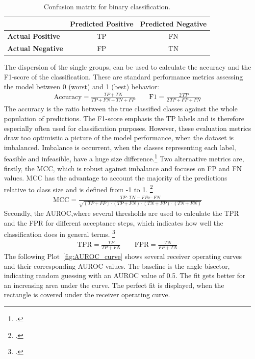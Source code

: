 \begin{table}[ht]
    \centering
    \small
    \begin{tabular}{@{}lcc@{}}
        \toprule
                                 & \textbf{Predicted Positive} & \textbf{Predicted Negative} \\
        \midrule
        \textbf{Actual Positive} & \Gls{TP}                    & \Gls{FN}                    \\
        \textbf{Actual Negative} & \Gls{FP}                    & \Gls{TN}                    \\
        \bottomrule
    \end{tabular}
    \caption{Confusion matrix for binary classification.}
    \label{tab:confusion_matrix}
\end{table}

The dispersion of the single groups, can be used to calculate the accuracy and the F1-score of the classification.
These are standard performance metrics assessing the model between 0 (worst) and 1 (best) behavior:
\begin{align}
    \text{Accuracy}=\frac{TP+TN}{TP+FN+TN+FP}
    \qquad
    \text{F1}=\frac{2\,TP}{2\,TP+FP+FN}
\end{align}
The accuracy is the ratio between the true classified classes against the whole population
of predictions. The F1-score emphasis the \gls{TP} labels and is therefore especially
often used for classification purposes.
However, these evaluation metrics draw too optimistic a picture of the model performance,
when the dataset is imbalanced. Imbalance is occurrent,
when the classes representing each label, feasible and infeasible, have a huge size difference.\footcite[cf.][p.2f.]{chicco_advantages_2020}
Two alternative metrics are, firstly, the \gls{MCC}, which is robust against imbalance
and focuses on \gls{FP} and \gls{FN} values. \gls{MCC} has the advantage to account the majority of the predictions
relative to class size and is defined from -1 to 1. \footcite[cf.][p.5]{chicco_advantages_2020}
\begin{align}
    \text{MCC}=\frac{TP \cdot TN - FP x\cdot FN}{\sqrt{(TP+FP)\cdot(TP+FN)\cdot(TN+FP)\cdot(TN+FN)}}
\end{align}
Secondly, the \gls{AUROC},where several thresholds are used
to calculate the \gls{TPR} and the \gls{FPR} for different acceptance steps,
which indicates how well the classification does in general terms. \footcite[cf.][p.2f.]{chicco_advantages_2020}
\begin{align}
    \text{TPR}=\frac{TP}{TP+FN}
    \qquad
    \text{FPR}=\frac{TN}{FP+TN}
\end{align}
The following Plot~\ref{fig:AUROC_curve} shows several receiver operating curves and their corresponding \gls{AUROC} values.
The baseline is the angle bisector, indicating random guessing with an \gls{AUROC} value of 0.5. The fit gets better
for an increasing area under the curve. The perfect fit is displayed, when the rectangle is covered under the receiver operating curve.

